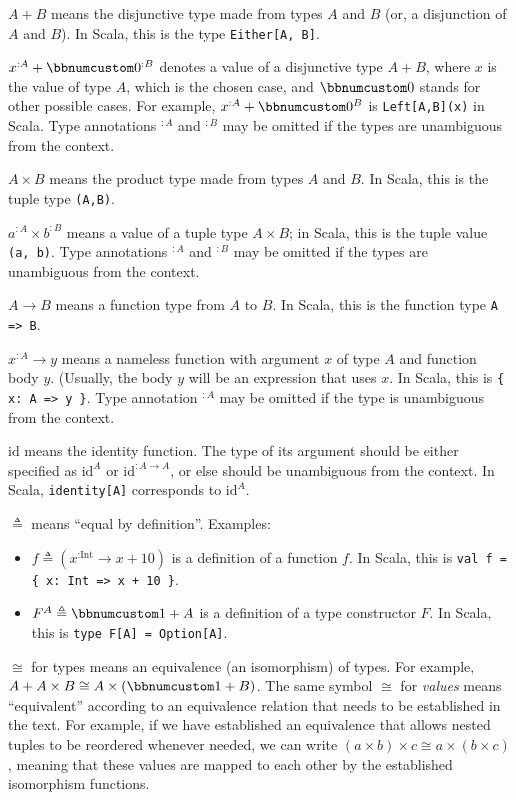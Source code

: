 $A+B$ means the disjunctive type made from types $A$ and $B$ (or,
a disjunction of $A$ and $B$). In Scala, this is the type \texttt{}\lstinline!Either[A, B]!.

$x^{:A}+\bbnum 0^{:B}$ denotes a value of a disjunctive type $A+B$,
where $x$ is the value of type $A$, which is the chosen case, and
$\bbnum 0$ stands for other possible cases. For example, $x^{:A}+\bbnum 0^{B}$
is \lstinline!Left[A,B](x)! in Scala. Type annotations $^{:A}$ and
$^{:B}$ may be omitted if the types are unambiguous from the context.

$A\times B$ means the product type made from types $A$ and $B$.
In Scala, this is the tuple type \lstinline!(A,B)!.

$a^{:A}\times b^{:B}$ means a value of a tuple type $A\times B$;
in Scala, this is the tuple value \lstinline!(a, b)!. Type annotations
$^{:A}$ and $^{:B}$ may be omitted if the types are unambiguous
from the context.

$A\rightarrow B$ means a function type from $A$ to $B$. In Scala,
this is the function type \lstinline!A => B!.

$x^{:A}\rightarrow y$ means a nameless function with argument $x$
of type $A$ and function body $y$. (Usually, the body $y$ will
be an expression that uses $x$. In Scala, this is \lstinline!{ x: A => y }!.
Type annotation $^{:A}$ may be omitted if the type is unambiguous
from the context.

$\text{id}$ means the identity function. The type of its argument
should be either specified as $\text{id}^{A}$ or $\text{id}^{:A\rightarrow A}$,
or else should be unambiguous from the context. In Scala,  \lstinline!identity[A]!
corresponds to $\text{id}^{A}$.

$\triangleq$ means \textsf{``}equal by definition\textsf{''}. Examples:
\begin{itemize}
\item $f\triangleq(x^{:\text{Int}}\rightarrow x+10)$ is a definition of
a function $f$. In Scala, this is \lstinline!val f = { x: Int => x + 10 }!.
\item $F^{A}\triangleq\bbnum 1+A$ is a definition of a type constructor
$F$. In Scala, this is \lstinline!type F[A] = Option[A]!.
\end{itemize}
$\cong$ for types means an equivalence (an isomorphism) of types.
For example, $A+A\times B\cong A\times\left(\bbnum 1+B\right)$. The
same symbol $\cong$ for \emph{values} means \textsf{``}equivalent\textsf{''} according
to an equivalence relation that needs to be established in the text.
For example, if we have established an equivalence that allows nested
tuples to be reordered whenever needed, we can write $\left(a\times b\right)\times c\cong a\times\left(b\times c\right)$,
meaning that these values are mapped to each other by the established
isomorphism functions. 

